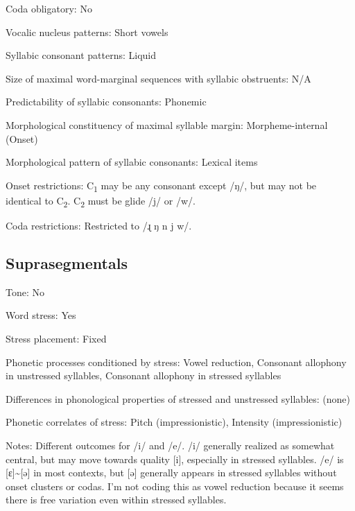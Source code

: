 {\begin{appendixdesc}
\item[Coda obligatory:] No

\item[Vocalic nucleus patterns:] Short vowels

\item[Syllabic consonant patterns:] Liquid

\item[Size of maximal word-marginal sequences with syllabic obstruents:] N/A

\item[Predictability of syllabic consonants:] Phonemic

\item[Morphological constituency of maximal syllable margin:] Morpheme-internal (Onset)

\item[Morphological pattern of syllabic consonants:] Lexical items

\item[Onset restrictions:] C\textsubscript{1} may be any consonant except /ŋ/, but may not be identical to C\textsubscript{2}. C\textsubscript{2} must be glide /j/ or /w/. 

\item[Coda restrictions:] Restricted to /ɻ ŋ n j w/.
\end{appendixdesc}
\subsection*{Suprasegmentals}
\begin{appendixdesc}
\item[Tone:] No

\item[Word stress:] Yes

\item[Stress placement:] Fixed

\item[Phonetic processes conditioned by stress:] Vowel reduction, Consonant allophony in unstressed syllables, Consonant allophony in stressed syllables

\item[Differences in phonological properties of stressed and unstressed syllables:] (none)

\item[Phonetic correlates of stress:] Pitch (impressionistic), Intensity (impressionistic)

\item[Notes:] Different outcomes for /i/ and /e/. /i/ generally realized as somewhat central, but may move towards quality [i], especially in stressed syllables. /e/ is [ɛ]{\textasciitilde}[ə] in most contexts, but [ə] generally appears in stressed syllables without onset clusters or codas. I’m not coding this as vowel reduction because it seems there is free variation even within stressed syllables.
\end{appendixdesc}
}
